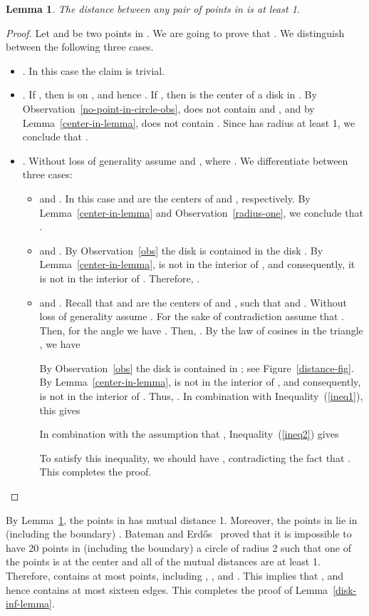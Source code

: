 \documentclass[11pt,a4paper]{article}
\newtheorem{lemma}{Lemma}
\begin{document}
\begin{lemma}
\label{distance-lemma}
The distance between any pair of points in  is at least 1.
\end{lemma}
\begin{proof}
Let  and  be two points in . We are going to prove that . We distinguish between the following three cases. 
\begin{itemize}
 \item . In this case the claim is trivial.
\item . If , then  is on , and hence . If , then  is the center of a disk  in . By Observation~\ref{no-point-in-circle-obs},  does not contain  and , and by Lemma~\ref{center-in-lemma},  does not contain . Since  has radius at least 1, we conclude that .

\item . Without loss of generality assume  and , where . We differentiate between three cases:
\begin{itemize}
 \item  and . In this case  and  are the centers of  and , respectively. By Lemma~\ref{center-in-lemma} and Observation~\ref{radius-one}, we conclude that .

\item  and . By Observation~\ref{obs} the disk  is contained in the disk . By Lemma~\ref{center-in-lemma},  is not in the interior of , and consequently, it is not in the interior of . Therefore, .
\item  and . Recall that  and  are the centers of  and , such that  and . Without loss of generality assume . For the sake of contradiction assume that . Then, for the angle  we have . Then, . By the law of cosines in the triangle , we have

By Observation~\ref{obs} the disk  is contained in ; see Figure~\ref{distance-fig}. By Lemma~\ref{center-in-lemma},  is not in the interior of , and consequently, is not in the interior of . Thus, . In combination with Inequality~(\ref{ineq1}), this gives


In combination with the assumption that , Inequality~(\ref{ineq2}) gives


To satisfy this inequality, we should have , contradicting the fact
that . This completes the proof.
\end{itemize}
\end{itemize}
\end{proof}

By Lemma~\ref{distance-lemma}, the points in  has mutual distance 1. Moreover, the points in  lie in (including the boundary) .
Bateman and Erd\H{o}s~\cite{Bateman1951} proved that it is impossible to have 20 points in (including the boundary) a circle of radius 2 such that one of the points is at the center and all of the mutual distances are at least 1.
Therefore,  contains at most  points, including , , and . This implies that , and hence  contains at most sixteen edges. This completes the proof of Lemma~\ref{disk-inf-lemma}.
\end{document}
